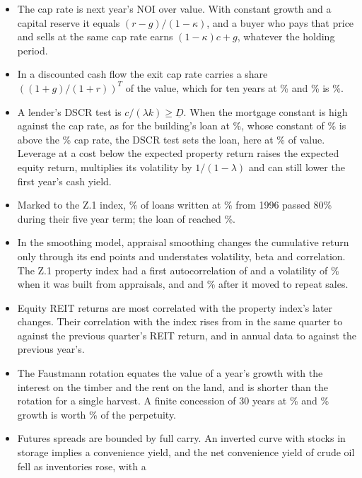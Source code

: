 \begin{chapterrefs}
\begin{itemize}
  \item The cap rate is next year's NOI over value. With constant growth and a capital reserve it equals
        $(r-g)/(1-\kappa)$, and a buyer who pays that price and sells at the same cap rate earns
        $(1-\kappa)c+g$, whatever the holding period.
  \item In a discounted cash flow the exit cap rate carries a share $((1+g)/(1+r))^T$ of the value, which
        for ten years at \pfR\% and \pfG\% is \pfSaleShare\%.
  \item A lender's DSCR test is $c/(\lambda k)\ge\underline D$. When the mortgage constant is high against
        the cap rate, as for the building's loan at \lvRate\%, whose constant of \lvK\% is above the \pfCap\% cap rate, the DSCR test sets the loan, here at \lvLtv\% of value.
        Leverage at a cost below the expected property return raises the expected equity return, multiplies
        its volatility by $1/(1-\lambda)$ and can still lower the first year's cash yield.
  \item Marked to the Z.1 index, \lcShareEighty\% of loans written at \lcLtvZero\% from 1996 passed 80\%
        during their five year term; the loan of \lcWorst{} reached \lcWorstPeak\%.
  \item In the smoothing model, appraisal smoothing changes the cumulative return only through its
        end points and understates volatility, beta and correlation. The Z.1 property index had a first autocorrelation of \smArPre{} and a
        volatility of \smVolPre\% when it was built from appraisals, and \smArPost{} and \smVolPost\% after it
        moved to repeat sales.
  \item Equity REIT returns are most correlated with the property index's later changes. Their
        correlation with the index rises from \rtCorrCreReit{} in the same quarter to \rtLeadOne{} against
        the previous quarter's REIT return, and in annual data to \rtCorrYLag{} against the previous
        year's.
  \item The Faustmann rotation equates the value of a year's growth with the interest on the timber and
        the rent on the land, and is shorter than the rotation for a single harvest. A finite concession of
        30 years at \tbRcon\% and \tbGcon\% growth is worth \tbShareThirty\% of the perpetuity.
  \item Futures spreads are bounded by full carry. An inverted curve with stocks in storage implies a
        convenience yield, and the net convenience yield of crude oil fell as inventories rose, with a

\end{itemize}
\end{chapterrefs}
